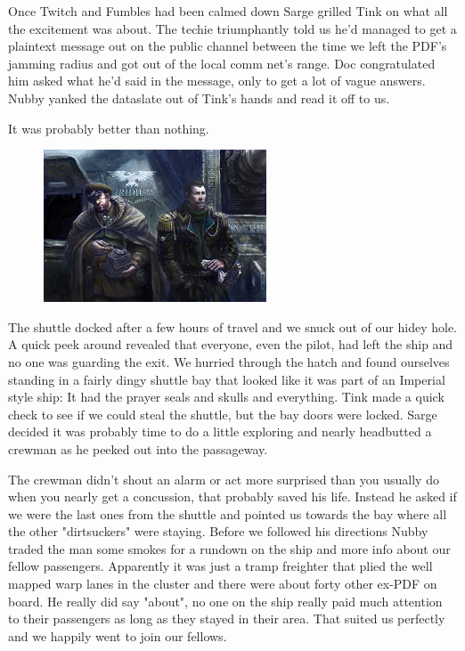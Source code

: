 Once Twitch and Fumbles had been calmed down Sarge grilled Tink on what all the excitement was about. 
The techie triumphantly told us he'd managed to get a plaintext message out on the public channel between the time we left the PDF's jamming radius and got out of the local comm net's range. 
Doc congratulated him asked what he'd said in the message, only to get a lot of vague answers. 
Nubby yanked the dataslate out of Tink's hands and read it off to us.



It was probably better than nothing.

\begin{figure}
	\begin{center}
		\includegraphics[width=\figwidth]{pics/10/56.png}
	\end{center}
\end{figure}
The shuttle docked after a few hours of travel and we snuck out of our hidey hole. 
A quick peek around revealed that everyone, even the pilot, had left the ship and no one was guarding the exit. 
We hurried through the hatch and found ourselves standing in a fairly dingy shuttle bay that looked like it was part of an Imperial style ship: 
It had the prayer seals and skulls and everything. 
Tink made a quick check to see if we could steal the shuttle, but the bay doors were locked. 
Sarge decided it was probably time to do a little exploring and nearly headbutted a crewman as he peeked out into the passageway.

The crewman didn't shout an alarm or act more surprised than you usually do when you nearly get a concussion, that probably saved his life. 
Instead he asked if we were the last ones from the shuttle and pointed us towards the bay where all the other "dirtsuckers" were staying. 
Before we followed his directions Nubby traded the man some smokes for a rundown on the ship and more info about our fellow passengers. 
Apparently it was just a tramp freighter that plied the well mapped warp lanes in the cluster and there were about forty other ex-PDF on board. 
He really did say "about", no one on the ship really paid much attention to their passengers as long as they stayed in their area. 
That suited us perfectly and we happily went to join our fellows.

